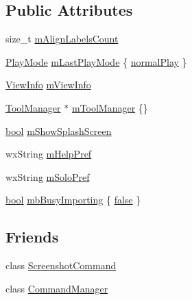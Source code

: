 \subsection*{Public Attributes}
\begin{DoxyCompactItemize}
\item 
size\+\_\+t \hyperlink{class_audacity_project_a2449643b5d7ede08b8d3919559aa72f1}{m\+Align\+Labels\+Count}
\item 
\hyperlink{_project_8h_a188092ed559d356ade9a517d60ec3f34}{Play\+Mode} \hyperlink{class_audacity_project_a2d83eeb120fa6b141d0343a1a8792c96}{m\+Last\+Play\+Mode} \{ \hyperlink{_project_8h_a188092ed559d356ade9a517d60ec3f34ad632a7b1f5edc85a4855bb3c016cca4c}{normal\+Play} \}
\item 
\hyperlink{class_view_info}{View\+Info} \hyperlink{class_audacity_project_aefe314298c89d89d301515e586d3c2fc}{m\+View\+Info}
\item 
\hyperlink{class_tool_manager}{Tool\+Manager} $\ast$ \hyperlink{class_audacity_project_a4d5de5c65abaf8dbe01f96a0749c507b}{m\+Tool\+Manager} \{\}
\item 
\hyperlink{mac_2config_2i386_2lib-src_2libsoxr_2soxr-config_8h_abb452686968e48b67397da5f97445f5b}{bool} \hyperlink{class_audacity_project_a90a9ba27847b89218615939c29affb15}{m\+Show\+Splash\+Screen}
\item 
wx\+String \hyperlink{class_audacity_project_a151dd4034c1375241e5a9016d2431c77}{m\+Help\+Pref}
\item 
wx\+String \hyperlink{class_audacity_project_accfaa03f2aa99ac25b64a502b1495a78}{m\+Solo\+Pref}
\item 
\hyperlink{mac_2config_2i386_2lib-src_2libsoxr_2soxr-config_8h_abb452686968e48b67397da5f97445f5b}{bool} \hyperlink{class_audacity_project_af569662fde524439adf8ee98301f7e60}{mb\+Busy\+Importing} \{ \hyperlink{mac_2config_2i386_2lib-src_2libsoxr_2soxr-config_8h_a65e9886d74aaee76545e83dd09011727}{false} \}
\end{DoxyCompactItemize}
\subsection*{Friends}
\begin{DoxyCompactItemize}
\item 
class \hyperlink{class_audacity_project_a760b79a183ea3e3e0a058eb7c0fa3564}{Screenshot\+Command}
\item 
class \hyperlink{class_audacity_project_a888fdc5dcbf7d0819360b7623849071b}{Command\+Manager}
\end{DoxyCompactItemize}


